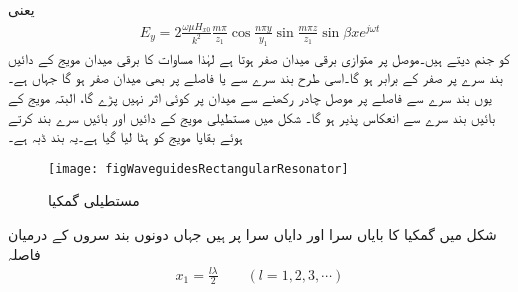 یعنی
\begin{align}\label{مساوات_مویج_گمکی_برقی_الف}
E_y=2 \frac{\omega \mu H_{x0}}{k^2}\frac{m \pi}{z_1}\cos \frac{n\pi y}{y_1} \sin \frac{m \pi z}{z_1} \sin \beta x e^{j\omega t}
\end{align}
کو جنم دیتے ہیں۔موصل پر متوازی برقی میدان صفر ہوتا ہے لہٰذا مساوات  کا برقی میدان مویج کے دائیں بند سرے پر صفر کے برابر ہو گا۔اسی طرح بند سرے سے  یا   فاصلے پر بھی میدان صفر ہو گا جہاں  ہے۔ یوں بند سرے سے  فاصلے پر موصل چادر رکھنے سے میدان پر کوئی اثر نہیں پڑے گا، البتہ  مویج کے  بائیں بند سرے سے انعکاس پذیر ہو گا۔ شکل  میں مستطیلی مویج کے دائیں اور بائیں سرے بند کرتے ہوئے بقایا مویج کو ہٹا لیا گیا ہے۔یہ بند ڈبہ  ہے۔  

\begin{figure}
\centering
\texttt{[image: figWaveguidesRectangularResonator]}
\caption{مستطیلی گمکیا}
\label{شکل_مویج_مستطیل_گمکیا}
\end{figure}
شکل  میں گمکیا کا بایاں سرا  اور دایاں سرا  پر ہیں جہاں دونوں بند سروں کے درمیان فاصلہ
\begin{align}\label{مساوات_مویج_گمکیا_لمبائی_شرط}
x_1=\frac{l \lambda}{2}  \quad \quad (l=1,2,3,\cdots)
\end{align}

